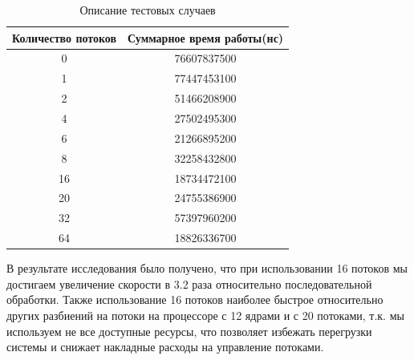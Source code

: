 \begin{table}[h]
    \begin{center}
        \begin{threeparttable}
    \caption{Описание тестовых случаев}
    \captionsetup{justification=raggedright, singlelinecheck=false}
    \label{tbl:mes}
    \begin{tabular}{|c|c|}
        \hline
        \textbf{Количество потоков} & \textbf{Суммарное время работы(нс)} \\
        \hline
        0 & 76607837500 \\
        \hline
        1 & 77447453100 \\
        \hline
        2 & 51466208900 \\
        \hline
        4 & 27502495300 \\
        \hline
        6 & 21266895200 \\
        \hline
        8 & 32258432800 \\
        \hline
        16 & 18734472100 \\
        \hline
        20 & 24755386900 \\
        \hline
        32 & 57397960200 \\
        \hline
        64 & 18826336700 \\
        \hline
    \end{tabular}
    \end{threeparttable}
    \end{center}
\end{table}

В результате исследования было получено, что при использовании 16 потоков мы достигаем увеличение скорости в 3.2 раза относительно последовательной обработки. Также использование 16 потоков наиболее быстрое относительно других разбиений на потоки на процессоре с 12 ядрами и с 20 потоками, т.к. мы используем не все доступные ресурсы, что позволяет избежать перегрузки системы и снижает накладные расходы на управление потоками.

\clearpage